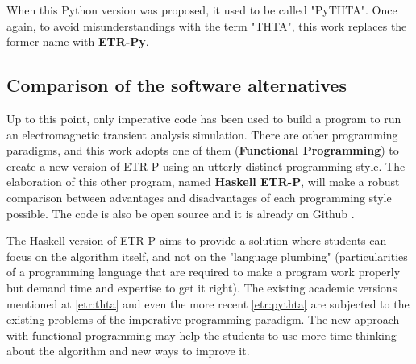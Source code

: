 When this Python version was proposed, it used to be called "PyTHTA". Once again, to avoid misunderstandings with the term "THTA", this work replaces the former name with \textbf{ETR-Py}.


\subsection{Comparison of the software alternatives}

Up to this point, only imperative code has been used to build a program to run an electromagnetic transient analysis simulation. There are other programming paradigms, and this work adopts one of them (\textbf{Functional Programming}) to create a new version of ETR-P using an utterly distinct programming style. The elaboration of this other program, named \textbf{Haskell ETR-P}, will make a robust comparison between advantages and disadvantages of each programming style possible. The code is also be open source and it is already on Github \cite{thtahs}.

The Haskell version of ETR-P aims to provide a solution where students can focus on the algorithm itself, and not on the "language plumbing" (particularities of a programming language that are required to make a program work properly but demand time and expertise to get it right). The existing academic versions mentioned at \ref{etr:thta} and even the more recent \ref{etr:pythta} are subjected to the existing problems of the imperative programming paradigm. The new approach with functional programming may help the students to use more time thinking about the algorithm and new ways to improve it.






